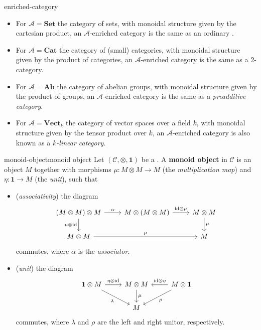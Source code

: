 \begin{example}{enriched-category}
    \begin{itemize}
        \item For $\mathcal{A} = \textbf{Set}$ the category of sets, with monoidal structure given by the cartesian product, an $\mathcal{A}$-enriched category is the same as an ordinary .
        \item For $\mathcal{A} = \textbf{Cat}$ the category of (small) categories, with monoidal structure given by the product of categories, an $\mathcal{A}$-enriched category is the same as a 2-category.
        \item For $\mathcal{A} = \textbf{Ab}$ the category of abelian groups, with monoidal structure given by the product of groups, an $\mathcal{A}$-enriched category is the same as a \textit{preadditive category}.
        \item For $\mathcal{A} = \textbf{Vect}_k$ the category of vector spaces over a field $k$, with monoidal structure given by the tensor product over $k$, an $\mathcal{A}$-enriched category is also known as a \textit{$k$-linear category}.
    \end{itemize}
\end{example}

\begin{topic}{monoid-object}{monoid object}
    Let $(\mathcal{C}, \otimes, \textbf{1})$ be a . A \textbf{monoid object} in $\mathcal{C}$ is an object $M$ together with morphisms $\mu \colon M \otimes M \to M$ (the \textit{multiplication map}) and $\eta \colon \textbf{1} \to M$ (the \textit{unit}), such that
    \begin{itemize}
        \item (\textit{associativity}) the diagram
        \[ \svg \begin{tikzcd} (M \otimes M) \otimes M \arrow[swap]{d}{\mu \otimes \id} \arrow{r}{\alpha} & M \otimes (M \otimes M) \arrow{r}{\id \otimes \mu} & M \otimes M \arrow{d}{\mu} \\ M \otimes M \arrow{rr}{\mu} && M \end{tikzcd} \]
        commutes, where $\alpha$ is the \textit{associator}.
        \item (\textit{unit}) the diagram
        \[ \svg \begin{tikzcd} \textbf{1} \otimes M \arrow{r}{\eta \otimes \id} \arrow[swap]{rd}{\lambda} & M \otimes M \arrow{d}{\mu} & M \otimes \textbf{1} \arrow[swap]{l}{\id \otimes \eta} \arrow{dl}{\rho} \\ & M & \end{tikzcd} \]
        commutes, where $\lambda$ and $\rho$ are the left and right unitor, respectively.
    \end{itemize}
\end{topic}

